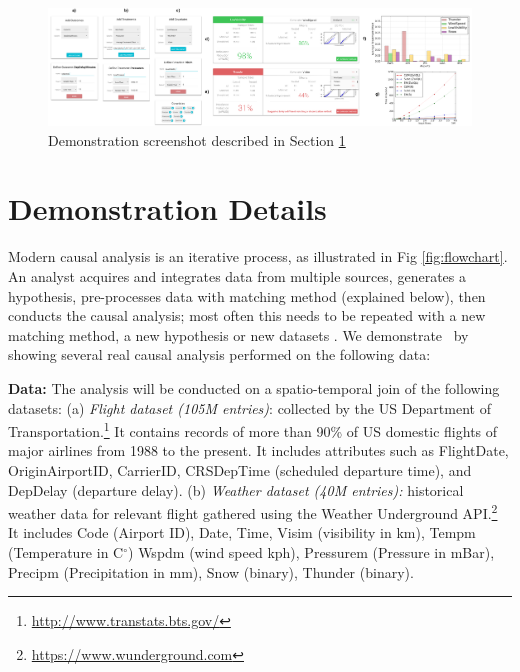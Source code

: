 \begin{figure}
\hspace{-.3cm}
\includegraphics[scale=0.145]{Figures/Demo-Tutorial-2.png}
\caption{Demonstration screenshot described in Section \ref{sec:dd}}
\label{sfig:demo-tutorial}
\end{figure}

\vspace{-.3cm}
\section{Demonstration Details}
\label{sec:dd}
Modern causal analysis is an iterative process, as  illustrated in Fig \ref{fig:flowchart}.
An analyst acquires and integrates data from multiple sources, generates a hypothesis, pre-processes  data with matching  method (explained below),
 then conducts the causal analysis; most often this needs to be repeated with a new matching
  method, a new hypothesis or  new datasets \cite{IacKinPor09}.
We demonstrate \GSQL\ by showing several real causal analysis performed on the following data: 


    {\bf Data:} The analysis will be conducted on a spatio-temporal join of the following datasets:
(a) {\it Flight dataset (105M entries)}: collected by the US
Department of Transportation.\footnote{\url{http://www.transtats.bts.gov/}} It contains
records of more than 90\% of US domestic flights of major airlines
from 1988 to the present. It includes attributes such as FlightDate, OriginAirportID,
CarrierID, CRSDepTime (scheduled departure time), and DepDelay (departure delay).
(b) {\it Weather dataset (40M entries):} historical weather data for relevant flight gathered using the Weather Underground API.\footnote{\url{https://www.wunderground.com}} It includes Code (Airport ID),
Date, Time,  Visim (visibility in km),
  Tempm (Temperature in C$^{\circ}$)
  Wspdm (wind speed kph), Pressurem (Pressure in mBar), Precipm  (Precipitation in mm), Snow (binary), Thunder (binary).






